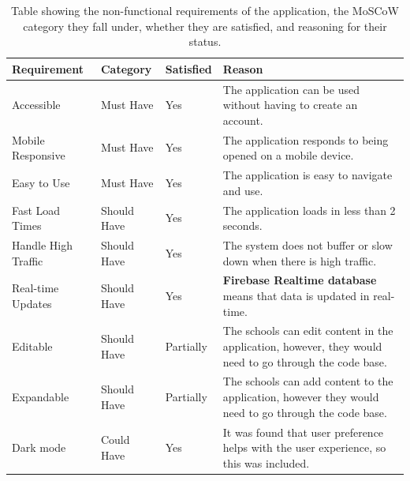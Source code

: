 \documentclass{l4proj}
\begin{document}
\begin{table}[ht]
    \caption{Table showing the non-functional requirements of the application,  the MoSCoW category they fall under,  whether they are satisfied,  and reasoning for their status. }\label{tab:non-functional}
    \begin{tabular}{ m{3cm}  m{2cm}  m{1.5cm}  m{17em} }
    \hline
    \textbf{Requirement}    & \textbf{Category}                & \textbf{Satisfied}      & \textbf{Reason}                      \\ %
    \hline
    
    Accessible & Must Have & Yes & The application can be used without having to create an account. \\

    Mobile Responsive & Must Have & Yes & The application responds to being opened on a mobile device. \\

    Easy to Use& Must Have & Yes & The application is easy to navigate and use. \\

    Fast Load Times & Should Have & Yes & The application loads in less than 2 seconds. \\
    
    Handle High Traffic & Should Have & Yes & The system does not buffer or slow down when there is high traffic. \\
    
    Real-time Updates & Should Have & Yes & \textbf{Firebase Realtime database} means that data is updated in real-time. \\

    Editable & Should Have & Partially & The schools can edit content in the application,  however,  they would need to go through the code base.\\

    Expandable & Should Have & Partially & The schools can add content to the application,  however they would need to go through the code base. \\
    
    Dark mode & Could Have & Yes & It was found that user preference helps with the user experience,  so this was included.

    \end{tabular}
\end{table}
\end{document}
